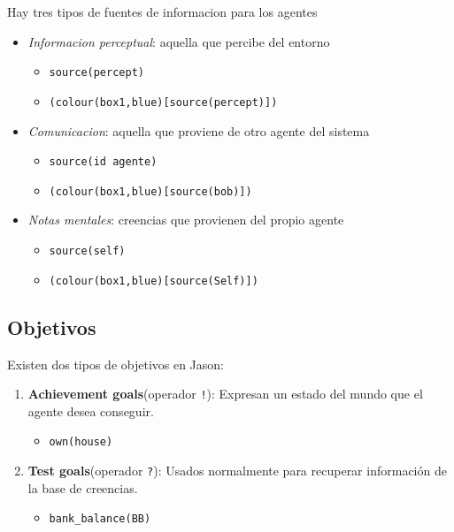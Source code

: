 Hay tres tipos de fuentes de informacion para los agentes
\begin{itemize}
	\item \textit{Informacion perceptual}: aquella que percibe del entorno
	      \begin{itemize}
		      \item \lstinline|source(percept)|
		      \item \lstinline|(colour(box1,blue)[source(percept)])|
	      \end{itemize}
	\item \textit{Comunicacion}: aquella que proviene de otro agente del
	      sistema
	      \begin{itemize}
		      \item \lstinline|source(id agente)|
		      \item \lstinline|(colour(box1,blue)[source(bob)])|
	      \end{itemize}
	\item \textit{Notas mentales}: creencias que provienen del propio agente
	      \begin{itemize}
		      \item \lstinline|source(self)|
		      \item \lstinline|(colour(box1,blue)[source(Self)])|
	      \end{itemize}
\end{itemize}

\subsection{Objetivos}

{Existen dos tipos de objetivos en Jason:\ns
\begin{enumerate}
	\item \textbf{Achievement goals}(operador \lstinline|!|): Expresan un estado del
mundo que el agente desea conseguir.
   \begin{itemize}
      \item \lstinline|own(house)|
   \end{itemize}
	\item \textbf{Test goals}(operador \lstinline|?|): Usados normalmente para recuperar información de la base de creencias.
   \begin{itemize}
      \item \lstinline|bank_balance(BB)|
   \end{itemize}
\end{enumerate}
}
